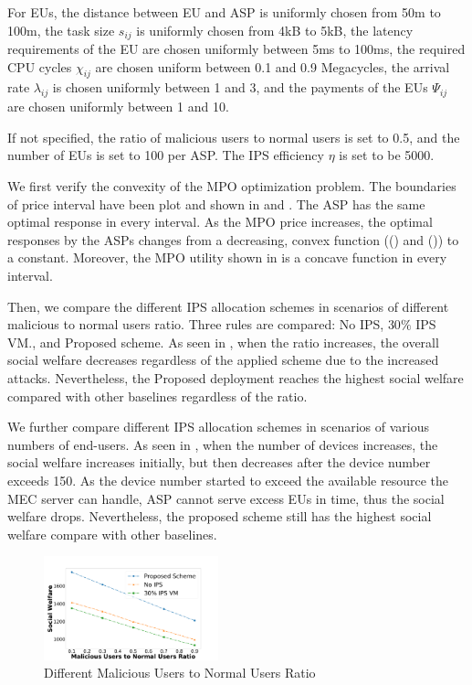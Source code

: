 \documentclass[conference]{IEEEtran}
\begin{document}
For EUs, the distance between EU and ASP is uniformly chosen from 50m to 100m, the task size $s_{ij}$ is uniformly chosen from 4kB to 5kB, the latency requirements of the EU are chosen uniformly between 5ms to 100ms, the required CPU cycles $\chi_{ij}$ are chosen uniform between 0.1 and 0.9 Megacycles, the arrival rate $\lambda_{ij}$ is chosen uniformly between 1 and 3\cite{fan2018application}, and the payments of the EUs $\Psi_{ij}$ are chosen uniformly between 1 and 10.


If not specified, the ratio of malicious users to normal users is set to 0.5, and the number of EUs is set to 100 per ASP. The IPS efficiency $\eta$ is set to be 5000. 


We first verify the convexity of the MPO optimization problem. The boundaries of price interval have been plot and shown in  and . The ASP has the same optimal response in every interval. As the MPO price increases, the optimal responses by the ASPs changes from a decreasing, convex function (() and ()) to a constant. Moreover, the MPO utility shown in  is a concave function in every interval. %


Then, we compare the different IPS allocation schemes in scenarios of different malicious to normal users ratio. Three rules are compared: No IPS, $30\%$ IPS VM., and Proposed scheme.  As seen in , when the ratio increases, the overall social welfare decreases regardless of the applied scheme due to the increased attacks. Nevertheless, the Proposed deployment reaches the highest social welfare compared with other baselines regardless of the ratio. 

We further compare different IPS allocation schemes in scenarios of various numbers of end-users. As seen in , when the number of devices increases, the social welfare increases initially, but then decreases after the device number exceeds 150. As the device number started to exceed the available resource the MEC server can handle, ASP cannot serve excess EUs in time, thus the social welfare drops. Nevertheless, the proposed scheme still has the highest social welfare compare with other baselines.

\begin{figure}
    \centering
  \includegraphics[width=0.45\textwidth]{5GDDoS_Game_social_ratio_conf.pdf}
    \caption{Different Malicious Users to Normal Users Ratio}
\vspace{-0.8em}
\label{subfig-1:ratio}
\end{figure}
\end{document}
